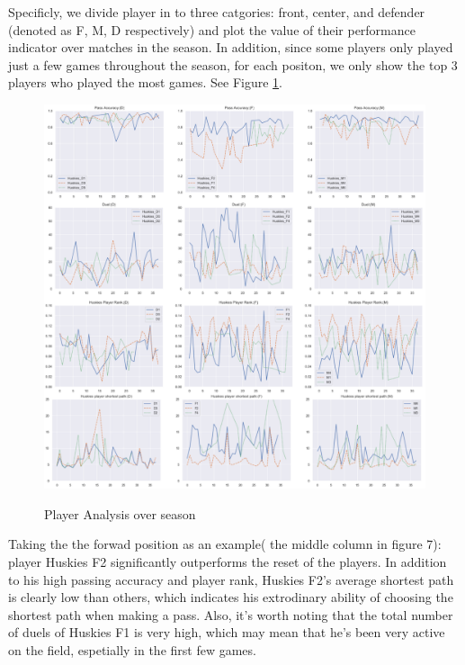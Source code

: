 \documentclass{mcmthesis}
\begin{document}
Specificly, we divide player in to three catgories: front, center, and defender (denoted as F, M, D respectively) and plot the value of their performance indicator over matches in the season. In addition, since some players only played just a few games throughout the season, for each positon, we only show the top 3 players who played the most games. See Figure \ref{12p}.
\begin{figure}[htbp]
  \centering
  \caption{Player Analysis over season}
  \includegraphics[width=15cm]{12pics.png}
  \label{12p}
\end{figure}

Taking the the forwad position as an example( the middle column in figure 7): player Huskies F2 significantly outperforms the reset of the players. In addition to his high passing accuracy and player rank, Huskies F2's average shortest path is clearly low than others, which indicates his extrodinary ability of choosing the shortest path when making a pass. Also, it's worth noting that  the total number of duels of Huskies F1 is very high, which may mean that he's been very active on the field, espetially in the first few games.
\end{document}
